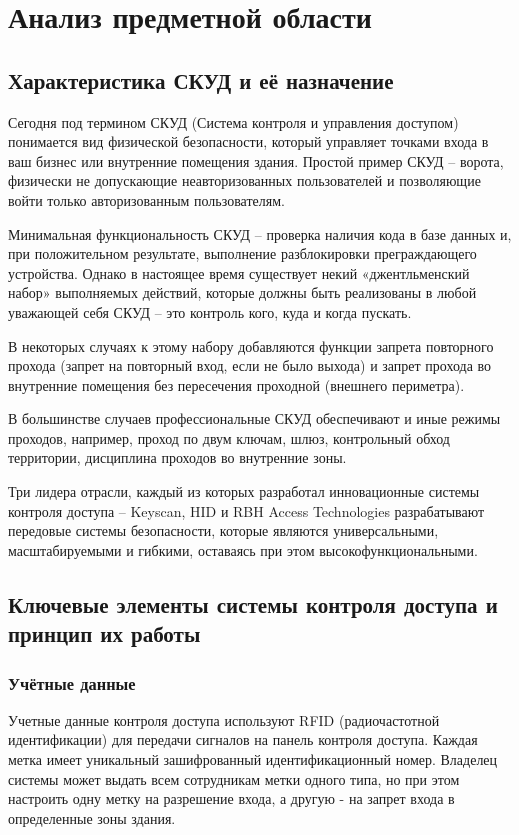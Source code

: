 \section{Анализ предметной области}
\subsection{Характеристика СКУД и её назначение}

Сегодня под термином СКУД (Система контроля и управления доступом) понимается вид физической безопасности, который управляет точками входа в ваш бизнес или внутренние помещения здания. Простой пример СКУД -- ворота, физически не допускающие неавторизованных пользователей и позволяющие войти только авторизованным пользователям.

Минимальная функциональность СКУД – проверка наличия кода в базе данных и, при положительном результате, выполнение разблокировки преграждающего устройства. Однако в настоящее время существует некий «джентльменский набор» выполняемых действий, которые должны быть реализованы в любой уважающей себя СКУД – это контроль кого, куда и когда пускать.

В некоторых случаях к этому набору добавляются функции запрета повторного прохода (запрет на повторный вход, если не было выхода) и запрет прохода во внутренние помещения без пересечения проходной (внешнего периметра).

В большинстве случаев профессиональные СКУД обеспечивают и иные режимы проходов, например, проход по двум ключам,  шлюз, контрольный обход территории, дисциплина проходов во внутренние зоны.

Три лидера отрасли, каждый из которых разработал инновационные системы контроля доступа -- Keyscan, HID и RBH Access Technologies разрабатывают передовые системы безопасности, которые являются универсальными, масштабируемыми и гибкими, оставаясь при этом высокофункциональными.

\subsection{Ключевые элементы системы контроля доступа и принцип их работы}
\subsubsection{Учётные данные}

Учетные данные контроля доступа используют RFID (радиочастотной идентификации) для передачи сигналов на панель контроля доступа. Каждая метка имеет уникальный зашифрованный идентификационный номер. Владелец системы может выдать всем сотрудникам метки одного типа, но при этом настроить одну метку на разрешение входа, а другую - на запрет входа в определенные зоны здания.

